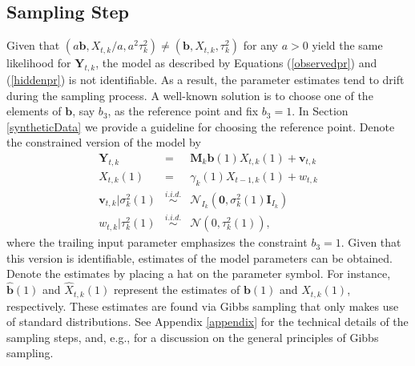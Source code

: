 \documentclass[aoas, preprint]{imsart}
\numberwithin{equation}{section}
\theoremstyle{plain}
\begin{document}
\subsection{Sampling Step}
\label{sampling_step}
Given that $\left(a \boldsymbol{b}, X_{t,k}/a, a^2 \tau_k^2\right) \neq \left(\boldsymbol{b}, X_{t,k}, \tau_k^2\right)$ for any $a > 0$ yield the same  likelihood for $\boldsymbol{Y}_{t,k}$, the model as described by Equations (\ref{observedpr}) and (\ref{hiddenpr}) is not identifiable. As a result, the parameter estimates tend to drift during the sampling process. A well-known solution is to choose one of the elements of $\boldsymbol{b}$, say $b_3$, as the reference point and fix $b_3 = 1$.  In Section \ref{syntheticData} we provide a guideline for choosing the reference point. Denote the constrained version of the model by
\begin{eqnarray*}
\boldsymbol{Y}_{t, k} &=&  \boldsymbol{M}_k \boldsymbol{b} (1) X_{t, k}(1)+ \boldsymbol{v}_{t, k}\\
X_{t, k}(1) &=& \gamma_k(1) X_{t-1, k}(1) + w_{t, k}\\
\boldsymbol{v}_{t, k} | \sigma^2_k(1) &\stackrel{i.i.d.}{\sim}& \mathcal{N}_{I_k}(\boldsymbol{0}, \sigma^2_k(1) \boldsymbol{I}_{I_k})\\
w_{t, k} | \tau^2_k(1) &\stackrel{i.i.d.}{\sim}& \mathcal{N}\left(0, \tau^2_k(1)\right),
\end{eqnarray*}
where the trailing input parameter emphasizes the constraint $b_{3} = 1$. Given that this version is identifiable, estimates of the model parameters can be obtained. Denote the estimates by placing a hat on the parameter symbol. For instance, $\hat{\boldsymbol{b}}(1)$ and $\hat{X}_{t, k}(1)$ represent the estimates of $\boldsymbol{b}(1)$ and $X_{t, k}(1)$, respectively. These estimates are found via Gibbs sampling that only makes use of standard distributions. See Appendix \ref{appendix} for the technical details of the sampling steps, and, e.g., \citet{gelman2003bayesian} for a discussion on the general principles of Gibbs sampling. 
\end{document}
